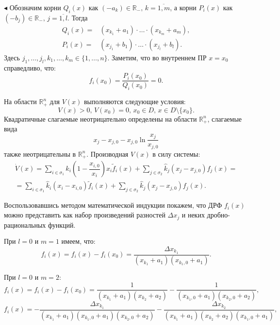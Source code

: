 \documentclass[12pt,a4paper]{extarticle}
\renewenvironment{proof}{\noindent$\blacktriangleleft$}{}
\theoremstyle{definition}
\theoremstyle{definition}
\theoremstyle{definition}
\begin{document}
	\begin{proof}
		Обозначим корни $Q_i(x)$ как $(-a_k)\in\mathbb{R}_{-},\, k=\overline{1,m}$, а корни $P_i(x)$ как $(-b_j)\in\mathbb{R}_{-},\, j=\overline{1,l}$. Тогда
		\begin{align*}
			Q_i(x)=&(x_{k_1}+a_1)\cdot\dots\cdot(x_{k_m}+a_m),\\
			P_i(x)=&(x_{j_1}+b_1)\cdot\dots\cdot(x_{j_l}+b_l).
		\end{align*}
		Здесь $j_1,\dots,j_l,k_1,\dots,k_m\in\{1,\dots,n\}$. Заметим, что во внутреннем ПР $x=x_0$ справедливо, что:
		\[f_i(x_0)=\dfrac{P_i(x_0)}{Q_i(x_0)}=0.\]
		
		На области $\mathbb{R}^n_{+}$ для $V(x)$ выполняются следующие условия:
		\[V(x)>0,\, V(x_0)=0,\, x_0\in D,\,x\in D\setminus\{x_0\}.\]
		Квадратичные слагаемые неотрицательно определены на области $\mathbb{R}^n_+$, слагаемые вида
		\[x_j-x_{j,0}-x_{j,0}\ln\dfrac{x_j}{x_{j,0}}\] 
		также неотрицательны в $\mathbb{R}^n_+$.
		Производная $V(x)$ в силу системы:
		\begin{multline*}
			\dot{V}(x)=\sum\limits_{i\in\sigma_1}\hat{k}_i\left(1-\dfrac{x_{i,0}}{x_i}\right)x_i\tilde{f}_i(x)+\sum\limits_{j\in\sigma_2}\hat{k}_j(x_j-x_{j,0})f_j(x)=\\
			=\sum\limits_{i\in\sigma_1}\hat{k}_i(x_i-x_{i,0})\tilde{f}_i(x)+\sum\limits_{j\in\sigma_2}\hat{k}_j(x_j-x_{j,0})f_j(x).
		\end{multline*}
		
		Воспользовавшись методом математической индукции покажем, что ДРФ $f_i(x)$ можно представить как набор произведений разностей $\Delta{}x_j$ и неких дробно-рациональных функций.
		
		При $l=0$ и $m=1$ имеем, что:
		\[f_i(x)=f_i(x)-f_i(x_0)=\dfrac{\Delta{}x_{k_1}}{(x_{k_1}+a_1)(x_{k_1,0}+a_1)}.\]
		
		При $l=0$ и $m=2$:
		\[f_i(x)=f_i(x)-f_i(x_0)=\dfrac{1}{(x_{k_1}+a_1)(x_{k_2}+a_2)}-\dfrac{1}{(x_{k_1,0}+a_1)(x_{k_2,0}+a_2)},\]
		\[f_i(x)=-\dfrac{\Delta{}x_{k_1}}{(x_{k_1}+a_1)(x_{k_1,0}+a_1)(x_{k_2,0}+a_2)}-\dfrac{\Delta{}x_{k_2}}{(x_{k_1}+a_1)(x_{k_2}+a_2)(x_{k_1,0}+a_1)},\]
		

\end{proof}
\end{document}

